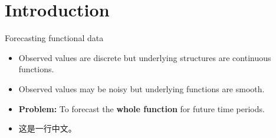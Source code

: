 \section{Introduction}

\begin{frame}{Forecasting functional data}
  \begin{itemize}[<+-| alert@+>]
    \item Observed values are discrete but underlying structures are
    continuous functions.
    \item Observed values may be noisy but underlying functions are
    smooth.
    \item \textbf{Problem:} To forecast the \textbf{whole function} for
    future time periods.
    \item 这是一行中文。  %
  \end{itemize}
\end{frame}

